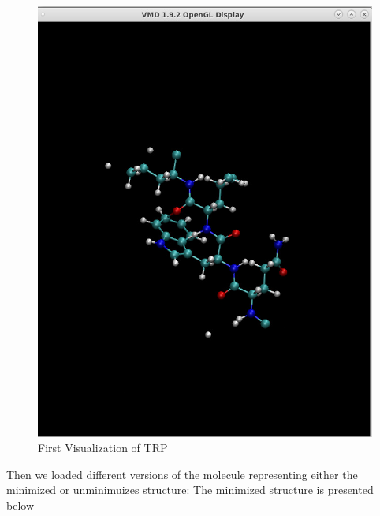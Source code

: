\documentclass[11pt]{article}
\makeatletter
\def\maxwidth{\ifdim\Gin@nat@width>\linewidth\linewidth
    \else\Gin@nat@width\fi}
\let\Oldincludegraphics\includegraphics
\renewcommand{\includegraphics}[1]{\Oldincludegraphics[width=.8\maxwidth]{#1}}
\makeatother
\begin{document}
\begin{figure}
\centering
\includegraphics{Screenshot_first_fig_trp.png}
\caption{First Visualization of TRP}
\end{figure}

Then we loaded different versions of the molecule representing either
the minimized or unminimuizes structure: The minimized structure is
presented below
\end{document}
